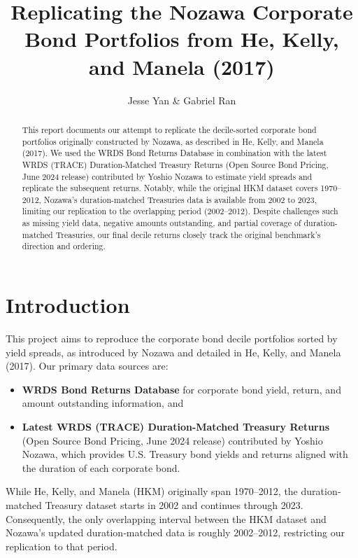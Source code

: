 \documentclass[12pt]{article}
\begin{document}
\title{
Replicating the Nozawa Corporate Bond Portfolios from He, Kelly, and Manela (2017)
}
\author{
Jesse Yan \& Gabriel Ran
}
\maketitle

\begin{abstract}
This report documents our attempt to replicate the decile-sorted corporate bond portfolios originally constructed by Nozawa, as described in He, Kelly, and Manela (2017). We used the WRDS Bond Returns Database in combination with the latest WRDS (TRACE) Duration-Matched Treasury Returns (Open Source Bond Pricing, June 2024 release) contributed by Yoshio Nozawa to estimate yield spreads and replicate the subsequent returns. Notably, while the original HKM dataset covers 1970--2012, Nozawa's duration-matched Treasuries data is available from 2002 to 2023, limiting our replication to the overlapping period (2002--2012). Despite challenges such as missing yield data, negative amounts outstanding, and partial coverage of duration-matched Treasuries, our final decile returns closely track the original benchmark’s direction and ordering.
\end{abstract}

\section{Introduction}
This project aims to reproduce the corporate bond decile portfolios sorted by yield spreads, as introduced by Nozawa and detailed in He, Kelly, and Manela (2017). Our primary data sources are:
\begin{itemize}
  \item \textbf{WRDS Bond Returns Database} for corporate bond yield, return, and amount outstanding information, and
  \item \textbf{Latest WRDS (TRACE) Duration-Matched Treasury Returns} (Open Source Bond Pricing, June 2024 release) contributed by Yoshio Nozawa, which provides U.S. Treasury bond yields and returns aligned with the duration of each corporate bond.
\end{itemize}

While He, Kelly, and Manela (HKM) originally span 1970--2012, the duration‐matched Treasury dataset starts in 2002 and continues through 2023. Consequently, the only overlapping interval between the HKM dataset and Nozawa’s updated duration‐matched data is roughly 2002--2012, restricting our replication to that period.
\end{document}
